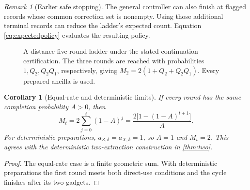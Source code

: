 \documentclass[11pt,a4paper]{article}
\newtheorem{corollary}[theorem]{Corollary}
\theoremstyle{definition}
\theoremstyle{remark}
\newtheorem{remark}[theorem]{Remark}
\begin{document}
\begin{remark}[Earlier safe stopping]
The general controller can also finish at flagged records whose common
correction set is nonempty. Using those additional terminal records can
reduce the ladder's expected count. Equation
\eqref{eq:expectedpolicy} evaluates the resulting policy.
\end{remark}

\begin{figure}[H]
\centering
{}
\caption{A distance-five round ladder under the stated continuation
certification. The three rounds are reached with probabilities
$1,Q_2,Q_2Q_1$, respectively, giving
$M_2=2(1+Q_2+Q_2Q_1)$. Every prepared ancilla is used.}
\label{fig:roundladder}
\end{figure}

\begin{corollary}[Equal-rate and deterministic limits]
If every round has the same completion probability $A>0$, then
\begin{equation}
 M_t=2\sum_{j=0}^{t}(1-A)^j
    =\frac{2\bigl[1-(1-A)^{t+1}\bigr]}{A}.
 \label{eq:constAR}
\end{equation}
For deterministic preparations, $a_{Z,\delta}=a_{X,\delta}=1$, so
$A=1$ and $M_t=2$. This agrees with the deterministic two-extraction
construction in \cref{thm:two}.
\end{corollary}
\begin{proof}
The equal-rate case is a finite geometric sum.
With deterministic preparations the first round meets both direct-use
conditions and the cycle finishes after its two gadgets.
\end{proof}
\end{document}
